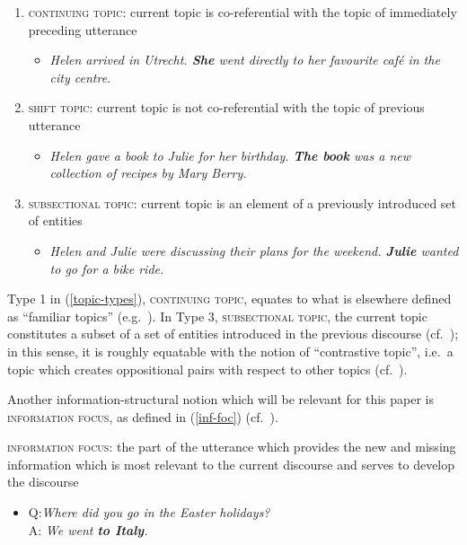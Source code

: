\documentclass[output=paper,colorlinks,citecolor=brown]{langscibook}
\begin{document}
\ea \label{topic-types}
\begin{enumerate}
\item \textsc{continuing topic}: current topic is co-referential with the topic of immediately preceding utterance
    \begin{itemize}
        \item \textit{Helen arrived in Utrecht. \textbf{She} went directly to her favourite café in the city centre.}
    \end{itemize} 
\item \textsc{shift topic}: current topic is not co-referential with the topic of previous utterance
    \begin{itemize}
        \item \textit{Helen gave a book to Julie for her birthday. \textbf{The book} was a new collection of recipes by Mary Berry.}
    \end{itemize}
\item \textsc{subsectional topic}: current topic is an element of a previously introduced set of entities
        \begin{itemize}
            \item \textit{Helen and Julie were discussing their plans for the weekend. \textbf{Julie} wanted to go for a bike ride.}
        \end{itemize}
\end{enumerate}
\z 

\noindent Type 1 in (\ref{topic-types}), \textsc{continuing topic}, equates to what is elsewhere defined as ``familiar topics'' (e.g.~\citealp{frascarelli2007types}). 
In Type 3, \textsc{subsectional topic}, the current topic constitutes a subset of a set of entities introduced in the previous discourse (cf.~\citealp[86]{hendriks1996information}); in this sense, it is roughly equatable with the notion of ``contrastive topic'', i.e.~a topic which creates oppositional pairs with respect to other topics 
(cf.~\citealp{frascarelli2007types,krifka07}). 

Another information-structural notion which will be relevant for this paper is \textsc{information focus}, as defined in (\ref{inf-foc}) (cf.~\citealp{reinhart1981pragmatics,vallduvi92,gotze2007information}). 

\ea \label{inf-foc}
\textsc{information focus}: the part of the utterance which provides the new and missing information which is most relevant to the current discourse and serves to develop the discourse
\begin{itemize}
    \item Q:\textit{Where did you go in the Easter holidays?}\\
    A: \textit{We went \textbf{to Italy}.}
\end{itemize}
\z 
\end{document}
